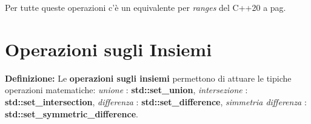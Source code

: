 \fleuron

\textsf{\small Per tutte queste operazioni c'è un equivalente per \emph{ranges} del C++20 a pag. \pageref{ranges}} \\


\newpage

\section{Operazioni sugli Insiemi}

\textsf{\small \textbf{Definizione: } Le \textbf{operazioni sugli insiemi} permettono di attuare le tipiche operazioni matematiche: \emph{unione} : \textbf{std::set\_union}, \emph{intersezione} : \textbf{std::set\_intersection}, \emph{differenza} : \textbf{std::set\_difference}, \emph{simmetria differenza} : \textbf{std::set\_symmetric\_difference}.} \\

